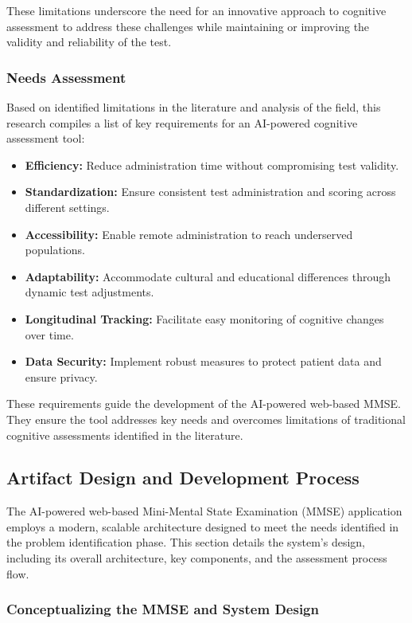 These limitations underscore the need for an innovative approach to cognitive assessment to address these challenges while maintaining or improving the validity and reliability of the test.

\subsubsection{Needs Assessment}

Based on identified limitations in the literature and analysis of the field, this research compiles a list of key requirements for an AI-powered cognitive assessment tool:
\begin{itemize}
\item \textbf{Efficiency:} Reduce administration time without compromising test validity.
\item \textbf{Standardization:} Ensure consistent test administration and scoring across different settings.
\item \textbf{Accessibility:} Enable remote administration to reach underserved populations.
\item \textbf{Adaptability:} Accommodate cultural and educational differences through dynamic test adjustments.
\item \textbf{Longitudinal Tracking:} Facilitate easy monitoring of cognitive changes over time.
\item \textbf{Data Security:} Implement robust measures to protect patient data and ensure privacy.
\end{itemize}
These requirements guide the development of the AI-powered web-based MMSE. They ensure the tool addresses key needs and overcomes limitations of traditional cognitive assessments identified in the literature.

\subsection{Artifact Design and Development Process}

The AI-powered web-based Mini-Mental State Examination (MMSE) application employs a modern, scalable architecture designed to meet the needs identified in the problem identification phase. This section details the system's design, including its overall architecture, key components, and the assessment process flow.

\subsubsection{Conceptualizing the MMSE and System Design}

